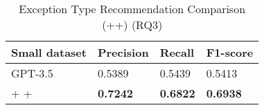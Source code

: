 \begin{table}[t]%
  \caption{Exception Type Recommendation Comparison (\xblock+\xstate+\xtype) (RQ3)}
  \vspace{-12pt}
  \small
	\begin{center}
		\renewcommand{\arraystretch}{1}
		\begin{tabular}{| p{3.10cm}<{\centering} | p{1.2cm}<{\centering} | p{1.2cm}<{\centering}| p{1.2cm}<{\centering}|}
		  \hline
			Small dataset  & Precision  & Recall & F1-score \\
			\hline
                        GPT-3.5 & 0.5389 & 0.5439 & 0.5413 \\
			\hline
			\xblock + \xstate  + \xtype  & \textbf{0.7242}  &  \textbf{0.6822} & \textbf{0.6938}\\
			\hline
		\end{tabular}
		\label{tab:xtype-2}
	\end{center}

\end{table}